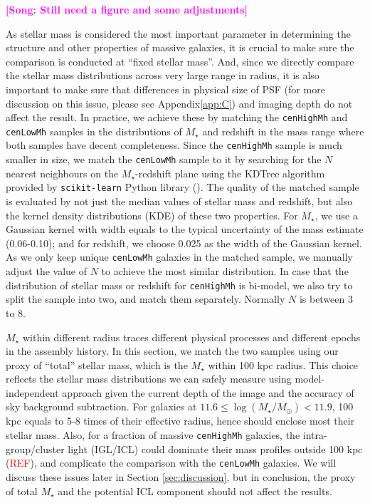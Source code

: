\documentclass{emulateapj}
\def\rbcg{\texttt{cenHighMh}}
\def\nbcg{\texttt{cenLowMh}}
\def\mstar{{$M_{\star}$}}
\newcommand{\addref}{{\textcolor{red}{REF}}}
\newcommand{\song}[1]{\textcolor{magenta}{\textbf{[Song: #1]}}}
\begin{document}
\begin{CJK*}{UTF8}{gbsn}
    
    \song{Still need a figure and some adjustments}
    
    As stellar mass is considered the most important parameter in determining the 
    structure and other properties of massive galaxies, it is crucial to make sure 
    the comparison is conducted at ``fixed stellar mass''. 
    And, since we directly compare the stellar mass distributions across very large 
    range in radius, it is also important to make sure that differences in physical 
    size of PSF (for more discussion on this issue, please see Appendix\ref{app:C}) 
    and imaging depth do not affect the result.    
    In practice, we achieve these by matching the \rbcg{} and \nbcg{} samples in 
    the distributions of \mstar{} and redshift in the mass range where both 
    samples have decent completeness.  
    Since the \rbcg{} sample is much smaller in size, we match the \nbcg{} sample to it 
    by searching for the $N$ nearest neighbours on the $M_{\star}$-redshift 
    plane using the KDTree algorithm provided by \texttt{scikit-learn} Python 
    library (\citealt{scikit-learn}). 
    The quality of the matched sample is evaluated by not just the median values 
    of stellar mass and redshift, but also the kernel density distributions (KDE) 
    of these two properties.
    For \mstar{}, we use a Gaussian kernel with width equals to the typical 
    uncertainty of the mass estimate (0.06-0.10);
    and for redshift, we choose 0.025 as the width of the Gaussian kernel. 
    As we only keep unique \nbcg{} galaxies in the matched sample, we manually adjust 
    the value of $N$ to achieve the most similar distribution. 
    In case that the distribution of stellar mass or redshift for \rbcg{} is 
    bi-model, we also try to split the sample into two, and match them separately.
    Normally $N$ is between 3 to 8.
    
    \mstar{} within different radius traces different physical processes and 
    different epochs in the assembly history.  
    In this section, we match the two samples using our proxy of ``total'' stellar 
    mass, which is the \mstar{} within 100 kpc radius.  
    This choice reflects the stellar mass distributions we can safely measure using 
    model-independent approach given the current depth of the image and the accuracy 
    of sky background subtraction.
    For galaxies at $11.6 \leq \log(M_{\star}/M_{\odot}) < 11.9$, 100 kpc equals to 
    5-8 times of their effective radius, hence should enclose most their stellar mass.
    Also, for a fraction of massive \rbcg{} galaxies, the intra-group/cluster light
    (IGL/ICL) could dominate their mass profiles outside 100 kpc (\addref), and 
    complicate the comparison with the \nbcg{} galaxies.  
    We will discuss these issues later in Section \ref{sec:discussion}, but in 
    conclusion, the proxy of total \mstar{} and the potential ICL component should 
    not affect the results.     
    

\end{CJK*}
\end{document}
